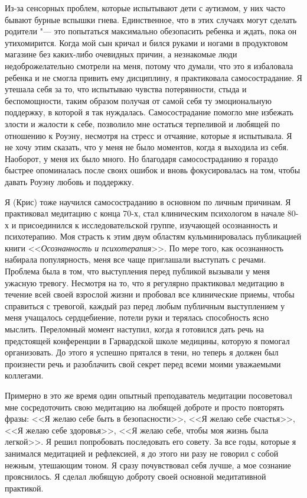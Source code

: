 	Из-за сенсорных проблем, которые испытывают дети с аутизмом, у них часто бывают бурные вспышки гнева. Единственное, что в этих случаях могут сделать родители "--- это попытаться максимально обезопасить ребенка и ждать, пока он утихомирится. Когда мой сын кричал и бился руками и ногами в продуктовом магазине без каких-либо очевидных причин, а незнакомые люди недоброжелательно смотрели на меня, потому что думали, что это я избаловала ребенка и не смогла привить ему дисциплину, я практиковала самосострадание. Я утешала себя за то, что испытываю чувства потерянности, стыда и беспомощности, таким образом получая от самой себя ту эмоциональную поддержку, в которой я так нуждалась. Самосострадание помогло мне избежать злости и жалости к себе, позволило мне остаться терпеливой и любящей по отношению к Роуэну, несмотря на стресс и отчаяние, которые я испытывала. Я не хочу этим сказать, что у меня не было моментов, когда я выходила из себя. Наоборот, у меня их было много. Но благодаря самосостраданию я гораздо быстрее опоминалась после своих ошибок и вновь фокусировалась на том, чтобы давать Роуэну любовь и поддержку.
	
	Я (Крис) тоже научился самосостраданию в основном по личным причинам. Я практиковал медитацию с конца 70-х, стал клиническим психологом в начале 80-х и присоединился к исследовательской группе, изучающей осознанность и психотерапию. Моя страсть к этим двум областям  кульминировалась публикацией книги <<\emph{Осознанность и психотерапия}>>. По мере того, как осознанность набирала популярность, меня все чаще приглашали выступать с речами. Проблема была в том, что выступления перед публикой вызывали у меня ужасную тревогу. Несмотря на то, что я регулярно практиковал медитацию в течение всей своей взрослой жизни и пробовал все клинические приемы, чтобы справиться с тревогой, каждый раз перед любым публичным выступлением у меня учащалось сердцебиение, потели руки и терялась способность ясно мыслить. Переломный момент наступил, когда я готовился дать речь на предстоящей конференции в Гарвардской школе медицины, которую я помогал организовать. До этого я успешно прятался в тени, но теперь я должен был произнести речь и разоблачить свой секрет перед всеми моими уважаемыми коллегами.
	
	Примерно в это же время один опытный преподаватель медитации посоветовал мне сосредоточить свою медитацию на любящей доброте и просто повторять фразы: <<Я желаю себе быть в безопасности>>, <<Я желаю себе счастья>>, <<Я желаю себе здоровья>>, <<Я желаю себе, чтобы моя жизнь была легкой>>. Я решил попробовать последовать его совету. За все годы, которые я занимался медитацией и рефлексией, я до этого ни разу не говорил с собой нежным, утешающим тоном. Я сразу почувствовал себя лучше, а мое сознание прояснилось. Я сделал любящую доброту своей основной медитативной практикой. 
	
